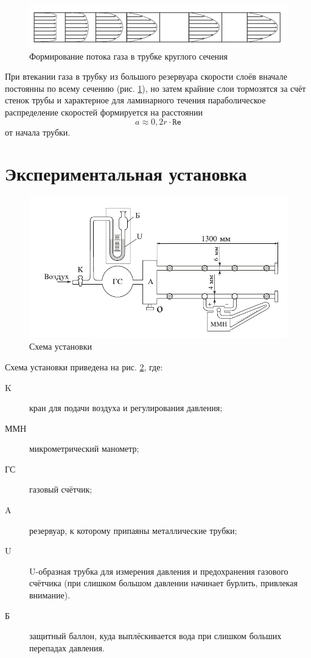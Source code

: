 \documentclass[12pt]{article}
\begin{document}
	\begin{figure}[!h]
	\caption{Формирование потока газа в трубке круглого сечения}
	\label{fig:form_str}
	\begin{center}
	\includegraphics[scale=0.7]{form_str.png}
	\end{center}
	\end{figure}
	
	При втекании газа в трубку из большого резервуара скорости слоёв вначале постоянны по всему сечению (рис. \ref{fig:form_str}), но затем крайние слои тормозятся за счёт стенок трубы и характерное для ламинарного течения параболическое распределение скоростей формируется на расстоянии
	\begin{equation}
	\label{eq:fdist}
	a \approx 0{,}2 r \cdot \texttt{Re}
	\end{equation}
	от начала трубки.
	
	\section*{Экспериментальная установка}
	
	\begin{figure}[!h]
	\caption{Схема установки}
	\label{fig:scheme}
	\begin{center}
	\includegraphics[scale=0.7]{scheme.png}
	\end{center}
	\end{figure}
	
	Схема установки приведена на рис. \ref{fig:scheme}, где:
	\begin{description}
		\item[K] кран для подачи воздуха и регулирования давления;
		\item[ММН] микрометрический манометр;
		\item[ГС] газовый счётчик;
		\item[A] резервуар, к которому припаяны металлические трубки;
		\item[U] U-образная трубка для измерения давления и предохранения газового счётчика (при слишком большом давлении начинает бурлить, привлекая внимание).
		\item[Б] защитный баллон, куда выплёскивается вода при слишком больших перепадах давления.
	\end{description}
	
\end{document}

